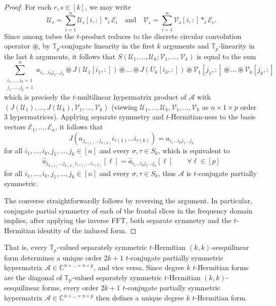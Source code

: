 \documentclass[11pt]{article}
\begin{document}
\begin{proof}
    For each $r,s\in [k]$, we may write 
    \[\mathcal{U}_r = \sum\limits_{i=1}^n\mathcal{U}_r[i,:]*_t\mathcal{E}_i\quad\text{and}\quad \mathcal{V}_s = \sum\limits_{i=1}^n\mathcal{V}_s[i,:]*_t\mathcal{E}_i.\]
    Since among tubes the $t$-product reduces to the discrete circular convolution operator $\circledast$, by $\mathbb{T}_p$-conjugate linearity in the first $k$ arguments and $\mathbb{T}_p$-linearity in the last $k$ arguments, it follows that  $S(\mathcal{U}_1,\dots,\mathcal{U}_k;\mathcal{V}_1,\dots,\mathcal{V}_k)$ is equal to the sum 
    \[\sum\limits_{\substack{i_1,\dots,i_k = 1 \\ j_1,\dots,j_k=1}}^na_{i_1\dots i_k j_1\dots j_k}\circledast J(\mathcal{U}_1[i_1,:])\circledast\dots \circledast J(U_k[i_k,:])\circledast \mathcal{V}_1[j_1,:]\circledast\dots \circledast \mathcal{V}_k[j_k,:]\]
    which is precisely the $t$-multilinear hypermatrix product of $\mathcal{A}$ with $(J(\mathcal{U}_1),\dots,J(\mathcal{U}_k),\mathcal{V}_1,\dots,\mathcal{V}_k)$ (viewing $\mathcal{U}_1,\dots,\mathcal{U}_k,\mathcal{V}_1,\dots,\mathcal{V}_k$ as $n\times 1\times p$ order $3$ hypermatrices). Applying separate symmetry and $t$-Hermitian-ness to the basis vectors $\mathcal{E}_1,\dots,\mathcal{E}_n$, it follows that 
    \[J(a_{j_{\sigma(1)}\dots j_{\sigma(k)}}i_{\tau(1)}\dots i_{\tau(k)}) = a_{i_1\dots i_k j_1\dots j_k}\]
    for all $i_1,\dots,i_k,j_1,\dots,j_k\in [n]$ and every $\sigma,\tau\in S_k$, which is equivalent to 
    \[\overline{\widehat{a}_{j_{\sigma(1)}\dots j_{\sigma(k)}i_{\tau(1)}\dots i_{\tau(k)}}[\ell]} = \widehat{a}_{i_1\dots i_k j_1\dots j_k}[\ell]\qquad \forall \ell\in [p]\]
    for all $i_1,\dots,i_k,j_1,\dots,j_k\in [n]$ and every $\sigma,\tau\in S_k$, thus $\mathcal{A}$ is $t$-conjugate partially symmetric. 

    The converse straightforwardly follows by reversing the argument. In particular, conjugate partial symmetry of each of the frontal slices in the frequency domain implies, after applying the inverse FFT, both separate symmetry and the $t$-Hermitian identity of the induced form. 
\end{proof}
That is, every $\mathbb{T}_p$-valued separately symmetric $t$-Hermitian $(k,k)$-sesquilinear form determines a unique order $2k+1$ $t$-conjugate partially symmetric hypermatrix $\mathcal{A}\in \mathbb{C}^{n\times\dots\times n\times p}$, and vice versa. Since degree $k$ $t$-Hermitian forms are the diagonal of $\mathbb{T}_p$-valued separately symmetric $t$-Hermitian $(k,k)$-sesquilinear forms, every order $2k+1$ $t$-conjugate partially symmetric hypermatrix $\mathcal{A}\in \mathbb{C}^{n\times\dots\times n\times p}$ then defines a unique degree $k$ $t$-Hermitian form. 
\end{document}
